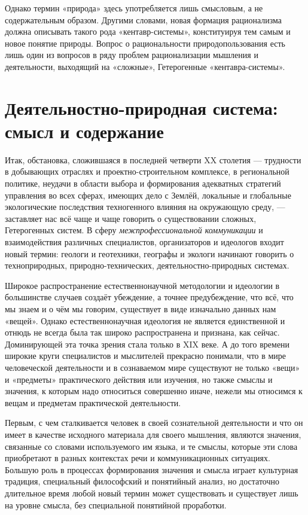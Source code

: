 \documentclass[11pt,a4paper]{article}
\begin{document}
Однако термин «природа» здесь употребляется лишь смысловым, а не
содержательным образом. Другими словами, новая формация рационализма должна
описывать такого рода «кентавр-системы», конституируя тем самым и новое
понятие природы. Вопрос о рациональности природопользования есть лишь один из
вопросов в ряду проблем рационализации мышления и деятельности, выходящий на
«сложные», Гетерогенные «кентавра-системы».

\section{Деятельностно-природная система: смысл и содержание}

Итак, обстановка, сложившаяся в последней четверти XX столетия — трудности в
добывающих отраслях и проектно-строительном комплексе, в региональной
политике, неудачи в области выбора и формирования адекватных стратегий
управления во всех сферах, имеющих дело с Землёй, локальные и глобальные
экологические последствия техногенного влияния на окружающую среду, —
заставляет нас всё чаще и чаще говорить о существовании сложных, Гетерогенных
систем.  В сферу \emph{межпрофессиональной коммуникации} и взаимодействия
различных специалистов, организаторов и идеологов входит новый термин: геологи
и геотехники, географы и экологи начинают говорить о техноприродных,
природно-технических, деятельностно-природных системах.

Широкое распространение естественнонаучной методологии и идеологии в
большинстве случаев создаёт убеждение, а точнее предубеждение, что всё, что мы
знаем и о чём мы говорим, существует в виде изначально данных нам «вещей».
Однако естественнонаучная идеология не является единственной и отнюдь не
всегда была так широко распространена и признана, как сейчас. Доминирующей эта
точка зрения стала только в XIX веке. А до того времени широкие круги
специалистов и мыслителей прекрасно понимали, что в мире человеческой
деятельности и в сознаваемом мире существуют не только «вещи» и «предметы»
практического действия или изучения, но также смыслы и значения, к которым
надо относиться совершенно иначе, нежели мы относимся к вещам и предметам
практической деятельности.

Первым, с чем сталкивается человек в своей сознательной деятельности и что он
имеет в качестве исходного материала для своего мышления, являются значения,
связанные со словами используемого им языка, и те смыслы, которые эти слова
приобретают в разных контекстах речи и коммуникационных ситуациях. Большую
роль в процессах формирования значения и смысла играет культурная традиция,
специальный философский и понятийный анализ, но достаточно длительное время
любой новый термин может существовать и существует лишь на уровне смысла, без
специальной понятийной проработки. 
\end{document}
